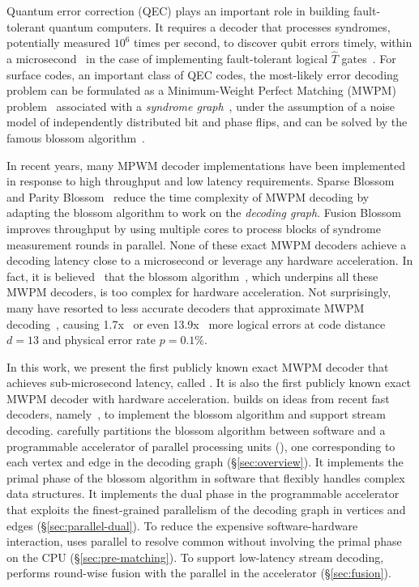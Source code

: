 Quantum error correction (QEC) plays an important role in building fault-tolerant quantum computers.
It requires a decoder that processes syndromes, potentially measured $10^6$ times per second, to discover qubit errors timely, within a microsecond~\cite{google2023suppressing} in the case of implementing fault-tolerant logical $\hat{T}$ gates~\cite{holmes2020nisq+}.
For surface codes, an important class of QEC codes, the most-likely error decoding problem can be formulated as a Minimum-Weight Perfect Matching (MWPM) problem~\cite{dennis2002topological} associated with a \emph{syndrome graph}~\cite{wu2022interpretation}, 
under the assumption of a noise model of independently distributed bit and phase flips, and can be solved by the famous blossom algorithm~\cite{edmonds1965paths,kolmogorov2009blossom}. 

In recent years, many MPWM decoder implementations have been implemented in response to high throughput and low latency requirements. Sparse Blossom~\cite{higgott2025sparse} and Parity Blossom~\cite{wu2023qce} reduce the time complexity of MWPM decoding by adapting the blossom algorithm to work on the \emph{decoding graph}. Fusion Blossom~\cite{wu2023qce} improves throughput by using multiple cores to process blocks of syndrome measurement rounds in parallel. 
None of these exact MWPM decoders achieve a decoding latency close to a microsecond or leverage any hardware acceleration. In fact, it is believed~\cite{vittal2023astrea} that the blossom algorithm~\cite{edmonds1965paths,kolmogorov2009blossom}, which underpins all these MWPM decoders, is too complex for hardware acceleration. Not surprisingly, many have resorted to less accurate decoders that approximate MWPM decoding~\cite{vittal2023astrea,liyanage2023qce,alavisamani2024promatch}, causing 1.7x~\cite{liyanage2023qce} or even 13.9x~\cite{alavisamani2024promatch} more logical errors at code distance $d=13$ and physical error rate $p=0.1\%$. 
    
In this work, we present the first publicly known exact MWPM decoder that achieves sub-microsecond latency, called \system. It is also the first publicly known exact MWPM decoder with hardware acceleration. \system builds on ideas from recent fast decoders, namely~\cite{wu2023qce,higgott2025sparse}, to implement the blossom algorithm and support stream decoding.
\system carefully partitions the blossom algorithm between software and a programmable accelerator of parallel processing units (\pus), one corresponding to each vertex and edge in the decoding graph (\S\ref{sec:overview}). 
It implements the primal phase of the blossom algorithm in software that flexibly handles complex data structures. It implements the dual phase in the programmable accelerator that exploits the finest-grained parallelism of the decoding graph in vertices and edges (\S\ref{sec:parallel-dual}).
To reduce the expensive software-hardware interaction, \system uses parallel \pus to resolve common \confs without involving the primal phase on the CPU (\S\ref{sec:pre-matching}). To support low-latency stream decoding, \system performs round-wise fusion with the parallel \pus in the accelerator (\S\ref{sec:fusion}).

